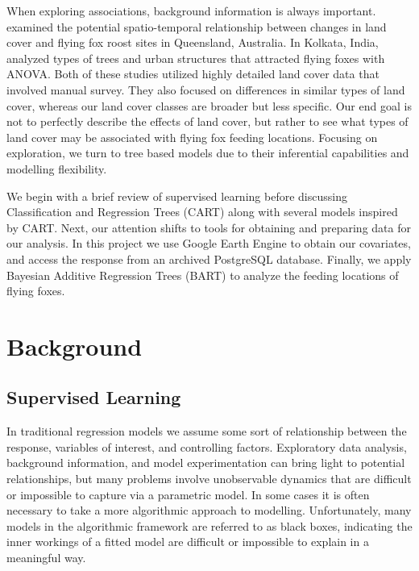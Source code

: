 \documentclass[
  12pt,
  letterpaper,
  DIV=11,
  numbers=noendperiod]{scrartcl}
\begin{document}
When exploring associations, background information is always important.
\cite{queens_lc} examined the potential spatio-temporal relationship
between changes in land cover and flying fox roost sites in Queensland,
Australia. In Kolkata, India, \cite{indian_lc} analyzed types of trees
and urban structures that attracted flying foxes with ANOVA. Both of
these studies utilized highly detailed land cover data that involved
manual survey. They also focused on differences in similar types of land
cover, whereas our land cover classes are broader but less specific. Our
end goal is not to perfectly describe the effects of land cover, but
rather to see what types of land cover may be associated with flying fox
feeding locations. Focusing on exploration, we turn to tree based models
due to their inferential capabilities and modelling flexibility.

We begin with a brief review of supervised learning before discussing
Classification and Regression Trees (CART) \cite{cart} along with
several models inspired by CART. Next, our attention shifts to tools for
obtaining and preparing data for our analysis. In this project we use
Google Earth Engine to obtain our covariates, and access the response
from an archived PostgreSQL database. Finally, we apply Bayesian
Additive Regression Trees (BART) \cite{bart_paper} to analyze the
feeding locations of flying foxes.

\section{Background}\label{sec:background}

\subsection{Supervised Learning}\label{supervised-learning}

In traditional regression models we assume some sort of relationship
between the response, variables of interest, and controlling factors.
Exploratory data analysis, background information, and model
experimentation can bring light to potential relationships, but many
problems involve unobservable dynamics that are difficult or impossible
to capture via a parametric model. In some cases it is often necessary
to take a more algorithmic approach to modelling. Unfortunately, many
models in the algorithmic framework are referred to as black boxes,
indicating the inner workings of a fitted model are difficult or
impossible to explain in a meaningful way.
\end{document}

